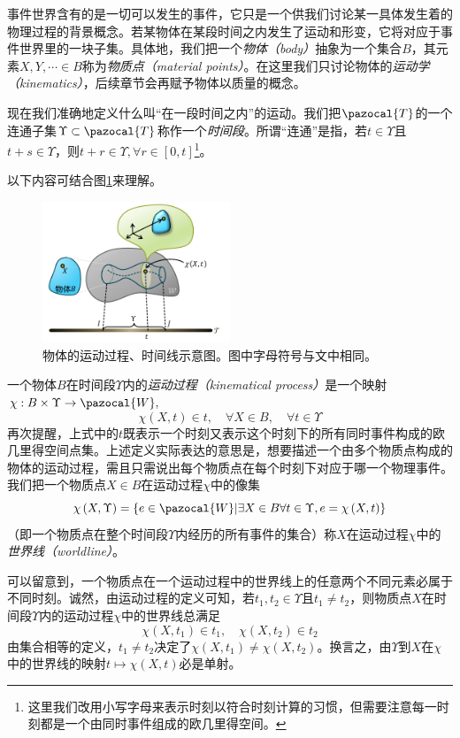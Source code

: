 \documentclass[main.tex]{subfiles}
\begin{document}
事件世界含有的是一切可以发生的事件，它只是一个供我们讨论某一具体发生着的物理过程的背景概念。若某物体在某段时间之内发生了运动和形变，它将对应于事件世界里的一块子集。具体地，我们把一个\emph{物体（body）}抽象为一个集合$B$，其元素$X,Y,\cdots\in B$称为\emph{物质点（material points）}。在这里我们只讨论物体的\emph{运动学（kinematics）}，后续章节会再赋予物体以质量的概念。

现在我们准确地定义什么叫“在一段时间之内”的运动。我们把$\pazocal{T}$的一个连通子集$\Upsilon\subset\pazocal{T}$称作一个\emph{时间段}。所谓“连通”是指，若$t\in\Upsilon$且$t+s\in\Upsilon$，则$t+r\in\Upsilon,\forall r\in\left[0,t\right]$\footnote{这里我们改用小写字母来表示时刻以符合时刻计算的习惯，但需要注意每一时刻都是一个由同时事件组成的欧几里得空间。}。

以下内容可结合图\ref{fig:III.5.2}来理解。

\begin{figure}[ht]
      \centering
      \includegraphics[width=0.5\textwidth]{images/III.5.2.pdf}
      \caption{物体的运动过程、时间线示意图。图中字母符号与文中相同。}
      \label{fig:III.5.2}
\end{figure}

一个物体$B$在时间段$\Upsilon$内的\emph{运动过程（kinematical process）}是一个映射$\chi:B\times\Upsilon\rightarrow\pazocal{W},$
\[\chi\left(X,t\right)\in t,\quad\forall X\in B,\quad\forall t\in\Upsilon\]
再次提醒，上式中的$t$既表示一个时刻又表示这个时刻下的所有同时事件构成的欧几里得空间点集。上述定义实际表达的意思是，想要描述一个由多个物质点构成的物体的运动过程，需且只需说出每个物质点在每个时刻下对应于哪一个物理事件。我们把一个物质点$X\in B$在运动过程$\chi$中的像集
\[\chi\left(X,\Upsilon\right)=\left\{e\in\pazocal{W}|\exists X\in B\forall t\in\Upsilon,e=\chi\left(X,t\right)\right\}\]
（即一个物质点在整个时间段$\Upsilon$内经历的所有事件的集合）称$X$在运动过程$\chi$中的\emph{世界线（worldline）}。

可以留意到，一个物质点在一个运动过程中的世界线上的任意两个不同元素必属于不同时刻。诚然，由运动过程的定义可知，若$t_1,t_2\in\Upsilon$且$t_1\neq t_2$，则物质点$X$在时间段$\Upsilon$内的运动过程$\chi$中的世界线总满足
\[\chi\left(X,t_1\right)\in t_1,\quad\chi\left(X,t_2\right)\in t_2\]
由集合相等的定义，$t_1\neq t_2$决定了$\chi\left(X,t_1\right)\neq\chi\left(X,t_2\right)$。换言之，由$\Upsilon$到$X$在$\chi$中的世界线的映射$t\mapsto\chi\left(X,t\right)$必是单射。
\end{document}
